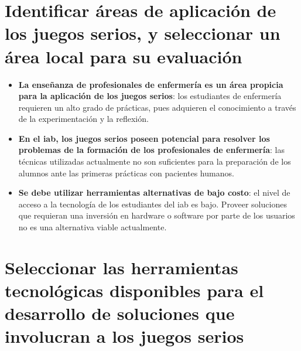 \section[Áreas de aplicación]%
{Identificar áreas de aplicación de los juegos serios, y seleccionar un área local para su evaluación}

\begin{itemize}

\item \textbf{La enseñanza de profesionales de enfermería es un área propicia para la aplicación de los juegos serios}: los estudiantes de enfermería requieren un alto grado de prácticas, pues adquieren el conocimiento a través de la experimentación y la reflexión\cite{humphreys2013developing}.
    
\item \textbf{En el \gls{iab}, los juegos serios poseen potencial para resolver los problemas de la formación de los profesionales de enfermería}: las técnicas utilizadas actualmente no son suficientes para la preparación de los alumnos ante las primeras prácticas con pacientes humanos. 

\item \textbf{Se debe utilizar herramientas alternativas de bajo costo}: el nivel de acceso a la tecnología de los estudiantes del \gls{iab} es bajo. Proveer soluciones que requieran una inversión en hardware o software por parte de los usuarios no es una alternativa viable actualmente.

\end{itemize}
    
\section[Selección de herramientas]%
{Seleccionar las herramientas tecnológicas disponibles para el desarrollo de soluciones que involucran a los juegos serios}

